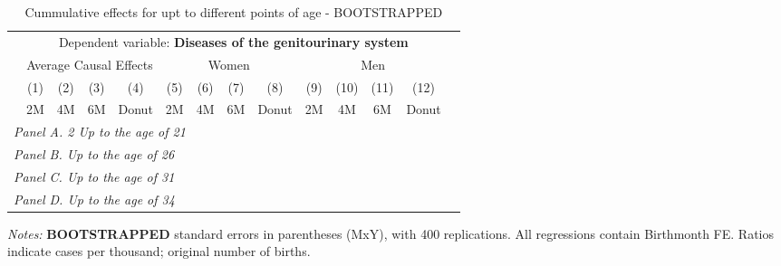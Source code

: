  \begin{table}[H] \begin{threeparttable} \centering \caption{Cummulative effects for upt to different points of age - BOOTSTRAPPED} {\def\sym#1{\ifmmode^{#1}\else\(^{#1}\)\fi} \begin{tabular}{l*{13}{c}} \toprule & \multicolumn{12}{c}{Dependent variable: \textbf{Diseases of the genitourinary system}} \\ \cmidrule(lr){2-13}
            &\multicolumn{4}{c}{Average Causal Effects}         &\multicolumn{4}{c}{Women}                          &\multicolumn{4}{c}{Men}                            \\\cmidrule(lr){2-5}\cmidrule(lr){6-9}\cmidrule(lr){10-13}
            &\multicolumn{1}{c}{(1)}&\multicolumn{1}{c}{(2)}&\multicolumn{1}{c}{(3)}&\multicolumn{1}{c}{(4)}&\multicolumn{1}{c}{(5)}&\multicolumn{1}{c}{(6)}&\multicolumn{1}{c}{(7)}&\multicolumn{1}{c}{(8)}&\multicolumn{1}{c}{(9)}&\multicolumn{1}{c}{(10)}&\multicolumn{1}{c}{(11)}&\multicolumn{1}{c}{(12)}\\
            &\multicolumn{1}{c}{2M}&\multicolumn{1}{c}{4M}&\multicolumn{1}{c}{6M}&\multicolumn{1}{c}{Donut}&\multicolumn{1}{c}{2M}&\multicolumn{1}{c}{4M}&\multicolumn{1}{c}{6M}&\multicolumn{1}{c}{Donut}&\multicolumn{1}{c}{2M}&\multicolumn{1}{c}{4M}&\multicolumn{1}{c}{6M}&\multicolumn{1}{c}{Donut}\\
\midrule
 \multicolumn{13}{l}{\emph{Panel A. 2 Up to the age of 21}} \\   \midrule\multicolumn{13}{l}{\emph{Panel B. Up to the age of 26}} \\   \midrule\multicolumn{13}{l}{\emph{Panel C. Up to the age of 31}} \\   \midrule\multicolumn{13}{l}{\emph{Panel D. Up to the age of 34}} \\   
\bottomrule \end{tabular} } \begin{tablenotes} \item \scriptsize \emph{Notes:} \textbf{BOOTSTRAPPED} standard errors in parentheses (MxY), with 400 replications. All regressions contain Birthmonth FE. Ratios indicate cases per thousand; original number of births. \end{tablenotes} \end{threeparttable} \end{table} 
